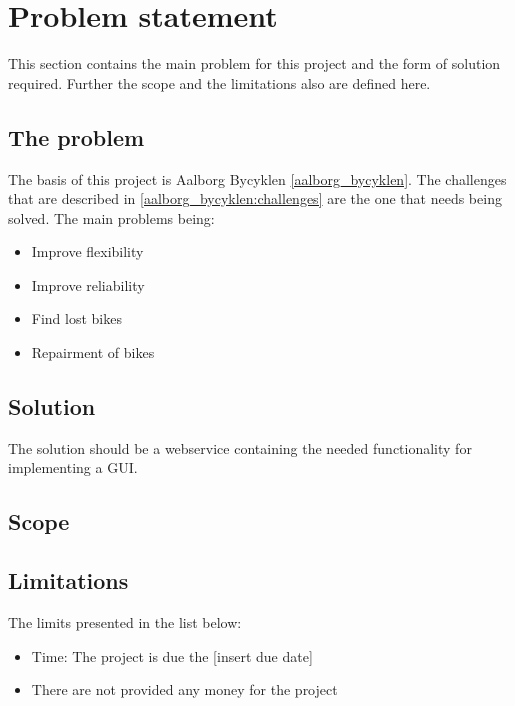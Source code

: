 \section{Problem statement}
This section contains the main problem for this project and the form of solution required.
Further the scope and the limitations also are defined here.
\subsection{The problem}
The basis of this project is Aalborg Bycyklen \cref{aalborg_bycyklen}.
The challenges that are described in \cref{aalborg_bycyklen:challenges} are the one that needs being solved.
The main problems being:
\begin{itemize}
\item Improve flexibility
\item Improve reliability
\item Find lost bikes
\item Repairment of bikes
\end{itemize}

\subsection{Solution}
The solution should be a webservice containing the needed functionality for implementing a GUI.

\subsection{Scope}

\subsection{Limitations}
The limits presented in the list below:
\begin{itemize}
\item Time: The project is due the [insert due date]
\item There are not provided any money for the project
\end{itemize}
